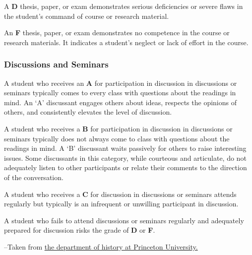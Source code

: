 A \textbf{D} thesis, paper, or exam demonstrates serious deficiencies or
severe flaws in the student's command of course or research material.

An \textbf{F} thesis, paper, or exam demonstrates no competence in the
course or research materials. It indicates a student's neglect or lack
of effort in the course.

\subsubsection{Discussions and Seminars}

A student who receives an \textbf{A} for participation in discussion in
discussions or seminars typically comes to every class with questions
about the readings in mind. An `A' discussant engages others about
ideas, respects the opinions of others, and consistently elevates the
level of discussion.

A student who receives a \textbf{B} for participation in discussion in
discussions or seminars typically does not always come to class with
questions about the readings in mind. A `B' discussant waits passively
for others to raise interesting issues. Some discussants in this
category, while courteous and articulate, do not adequately listen to
other participants or relate their comments to the direction of the
conversation.

A student who receives a \textbf{C} for discussion in discussions or
seminars attends regularly but typically is an infrequent or unwilling
participant in discussion.

A student who fails to attend discussions or seminars regularly and
adequately prepared for discussion risks the grade of \textbf{D} or
\textbf{F}.

--Taken from
\href{http://www.princeton.edu/history/undergraduate/grading\_practices/}{the
department of history at Princeton University.}
